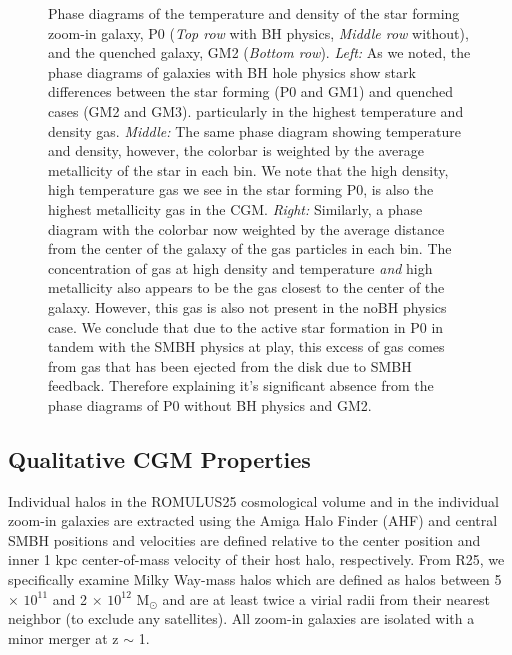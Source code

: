 \documentclass[]{emulateapj}
\begin{document}
\begin{figure}[h!]
\caption[]{Phase diagrams of the temperature and density of the star forming zoom-in galaxy, P0 (\textit{Top row} with BH physics, \textit{Middle row} without), and the quenched galaxy, GM2 (\textit{Bottom row}). \textit{Left:} As we noted, the phase diagrams of galaxies with BH hole physics show stark differences between the star forming (P0 and GM1) and quenched cases (GM2 and GM3).  particularly in the highest temperature and density gas. \textit{Middle:} The same phase diagram showing temperature and density, however, the colorbar is weighted by the average metallicity of the star in each bin. We note that the high density, high temperature gas we see in the star forming P0, is also the highest metallicity gas in the CGM. \textit{Right:} Similarly, a phase diagram with the colorbar now weighted by the average distance from the center of the galaxy of the gas particles in each bin. The concentration of gas at high density and temperature \textit{and} high metallicity also appears to be the gas closest to the center of the galaxy. However, this gas is also not present in the noBH physics case. We conclude that due to the active star formation in P0 in tandem with the SMBH physics at play, this excess of gas comes from gas that has been ejected from the disk due to SMBH feedback. Therefore explaining it's significant absence from the phase diagrams of P0 without BH physics and GM2.}
\label{figure:phasediagrams_z_R}
\end{figure}


\subsection{Qualitative CGM Properties}

Individual halos in the ROMULUS25 cosmological volume and in the individual zoom-in galaxies are extracted using the Amiga Halo Finder (AHF) \citep{Knollmann2009} and central SMBH positions and velocities are defined relative to the center position and inner 1 kpc center-of-mass velocity of their host halo, respectively. From R25, we specifically examine Milky Way-mass halos which are defined as halos between 5 $\times$ $10^{11}$ and 2 $\times$ $10^{12}$ M$_{\odot}$ and are at least twice a virial radii from their nearest neighbor (to exclude any satellites). All zoom-in galaxies are isolated with a minor merger at z $\sim$ 1.  
\end{document}
